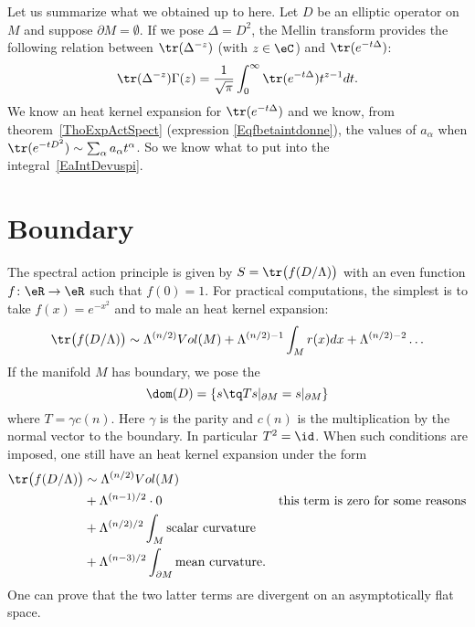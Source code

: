 Let us summarize what we obtained up to here. Let $D$ be an elliptic operator on $M$ and suppose $\partial M=\emptyset$. If we pose $\Delta=D^2$, the Mellin transform provides the following relation between $\tr(\Delta^{-z})$ (with $z\in\eC$) and $\tr( e^{-t\Delta})$:
\begin{equation}		\label{EaIntDevuspi}
\tr(\Delta^{-z})\Gamma(z)=\frac{1}{ \sqrt{\pi} }\int_0^{\infty}\tr( e^{-t\Delta})t^{z-1}dt.
\end{equation}
We know an heat kernel expansion for $\tr( e^{-t\Delta})$ and we know, from theorem~\ref{ThoExpActSpect} (expression \eqref{Eqfbetaintdonne}), the values of $a_{\alpha}$ when $\tr( e^{-tD^2})\sim\sum_{\alpha}a_{\alpha}t^{\alpha}$. So we know what to put into the integral~\ref{EaIntDevuspi}.

\section{Boundary}

The spectral action principle is given by $S=\tr\big( f(D/\Lambda) \big)$ with an even function $f\colon \eR\to \eR$ such that $f(0)=1$. For practical computations, the simplest is to take $f(x)= e^{-x^2}$ and to male an heat kernel expansion:
\[
  \tr\big( f(D/\Lambda) \big)\sim \Lambda^{(n/2)}Vol(M)+\Lambda^{(n/2)-1}\int_Mr(x)dx+\Lambda^{(n/2)-2}\ldots
\]
If the manifold $M$ has boundary, we pose the 
\begin{equation}
\dom(D)=\{ s\tq Ts|_{\partial M}=s|_{\partial M} \}
\end{equation}
where $T=\gamma c(n)$. Here $\gamma$ is the parity and $c(n)$ is the multiplication by the normal vector to the boundary. In particular $T^2=\id$. When such conditions are imposed, one still have an heat kernel expansion under the form
\begin{align}
\tr\big( f(D/\Lambda) \big)&\sim \Lambda^{(n/2)}Vol(M)\\
				&+\Lambda^{(n-1)/2}\cdot 0&\textrm{this term is zero for some reasons}\\
				&+\Lambda^{(n/2)/2}\int_M \textrm{scalar curvature}\\
				&+\Lambda^{(n-3)/2}\int_{\partial M}\textrm{mean curvature}.
\end{align}
One can prove that the two latter terms are divergent on an asymptotically flat space.
